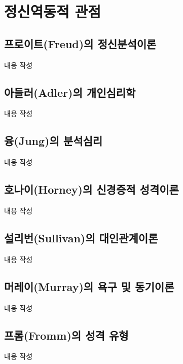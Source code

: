 \section{정신역동적 관점}

\subsection{프로이트(Freud)의 정신분석이론}
내용 작성

\subsection{아들러(Adler)의 개인심리학}
내용 작성

\subsection{융(Jung)의 분석심리}
내용 작성

\subsection{호나이(Horney)의 신경증적 성격이론}
내용 작성

\subsection{설리번(Sullivan)의 대인관계이론}
내용 작성

\subsection{머레이(Murray)의 욕구 및 동기이론}
내용 작성

\subsection{프롬(Fromm)의 성격 유형}
내용 작성
